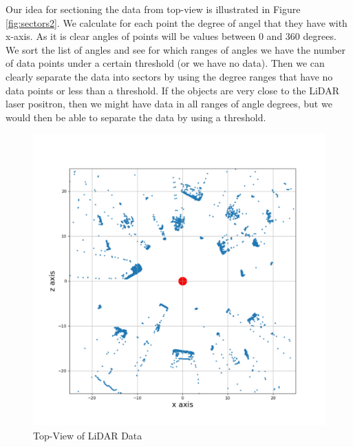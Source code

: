 Our idea for sectioning the data from top-view is illustrated in Figure \ref{fig:sectors2}. We calculate for each point the degree of angel 
that they have with x-axis. As it is clear angles of points will be values between 0 and 360 degrees. We sort the list of angles and see for 
which ranges of angles we have the number of data points under a certain threshold (or we have no data). Then we can clearly separate the data 
into sectors by using the degree ranges that have no data points or less than a threshold. If the objects are very close to the LiDAR laser 
positron, then we might have data in all ranges of angle degrees, but we would then be able to separate the data by using a threshold.
\begin{figure}[!h]
\centering
\begin{minipage}{0.40\textwidth}
  \centering
         \includegraphics[scale=0.3]{./images/sector-transforms/scene-with-centre.pdf}
       \caption{Top-View of LiDAR Data}
       \label{fig:sectors1}
\end{minipage}%
\begin{minipage}{0.40\textwidth}
  \centering

\end{minipage}
\end{figure}
